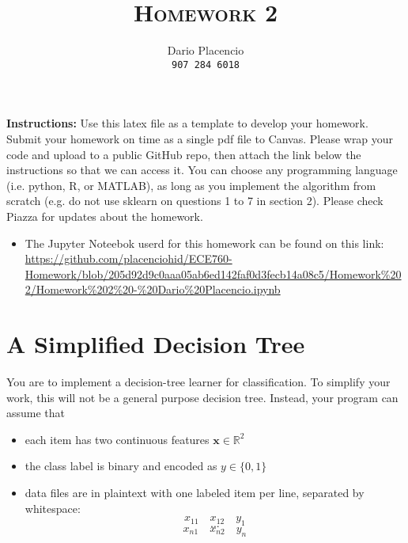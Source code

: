 \documentclass[a4paper]{article}
\title{\textsc{Homework 2}} %
\author{Dario Placencio\\
\texttt{907 284 6018}}
\date{}
\theoremstyle{definition}
\newcommand{\RR}{\mathbb{R}}
\def\x{\mathbf x}
\begin{document}
\maketitle 

\textbf{Instructions:} 
Use this latex file as a template to develop your homework. Submit your homework on time as a single pdf file to Canvas. Please wrap your code and upload to a public GitHub repo, then attach the link below the instructions so that we can access it. You can choose any programming language (i.e. python, R, or MATLAB), as long as you implement the algorithm from scratch (e.g. do not use sklearn on questions 1 to 7 in section 2). Please check Piazza for updates about the homework.

\begin{itemize}
  \item The Jupyter Noteebok userd for this homework can be found on this link: \url{https://github.com/placenciohid/ECE760-Homework/blob/205d92d9c0aaa05ab6ed142faf0d3fecb14a08c5/Homework%202/Homework%202%20-%20Dario%20Placencio.ipynb}
\end{itemize}

\section{A Simplified Decision Tree}
You are to implement a decision-tree learner for classification.
To simplify your work, this will not be a general purpose decision tree.  Instead, your program can assume that
\begin{itemize}
\item each item has two continuous features $\x \in \RR^2$
\item the class label is binary and encoded as $y \in \{0,1\}$
\item data files are in plaintext with one labeled item per line, separated by whitespace:
$$x_{11} \quad x_{12} \quad y_1$$
$$...$$
$$x_{n1} \quad x_{n2} \quad y_n$$
\end{itemize}
\end{document}
